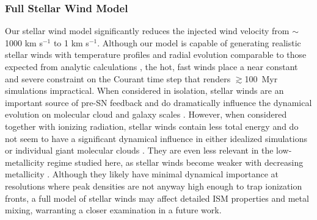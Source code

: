 \documentclass[twocolumn]{aastex61}
\begin{document}
\subsubsection{Full Stellar Wind Model}
\label{sec:stellar winds discussion}
Our stellar wind model significantly reduces the injected wind velocity from $\sim$1000 km s$^{-1}$ to 1 km s$^{-1}$. Although our model is capable of generating realistic stellar winds with temperature profiles and radial evolution comparable to those expected from analytic calculations \citep{Weaver1977}, the hot, fast winds place a near constant and severe constraint on the Courant time step that renders $\gtrsim$100~Myr simulations impractical. When considered in isolation, stellar winds are an important source of pre-SN feedback and do dramatically influence the dynamical evolution on molecular cloud and galaxy scales \citep{Dale2008,Peters2017,Gatto2017}. However, when considered together with ionizing radiation, stellar winds contain less total energy \citep{Agertz2013} and do not seem to have a significant dynamical influence in either idealized simulations \citep{Geen2015} or 
   individual giant molecular clouds
\citep{Dale2014}. They are even less relevant in the low-metallicity regime studied here, as stellar winds become weaker with decreasing metallicity \citep{Puls2000, Vink2005}. Although they likely have minimal dynamical importance
   at resolutions where peak densities are not anyway high enough to trap ionization 
   fronts, 
a full model of stellar winds may affect detailed ISM properties and metal mixing, warranting a closer examination in a future work.

\end{document}
